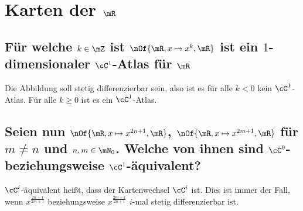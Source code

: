 \section{Karten der $\mR$}
\subsection{Für welche $k\in\mZ$ ist $\nOf{\mR,x\mapsto x^k,\mR}$ ist ein $1$-dimensionaler $\cC^1$-Atlas für $\mR$}
Die Abbildung soll stetig differenzierbar sein, also ist es für alle $k < 0$  kein $\cC^1$-Atlas. Für alle $k\geq 0$ ist es ein $\cC^1$-Atlas.

\subsection{Seien nun $\nOf{\mR,x\mapsto x^{2n+1},\mR}$, $\nOf{\mR,x\mapsto x^{2m+1},\mR}$ für $m\neq n$ und $n,m\in \mN_0$. Welche von ihnen sind $\cC^0$- beziehungsweise $\cC^1$-äquivalent?}
$\cC^i$-äquivalent heißt, dass der Kartenwechsel $\cC^i$ ist. Dies ist immer der Fall, wenn $x^{\frac{2n+1}{2m+1}}$ beziehungsweise $x^{\frac{2m+1}{2n+1}}$ $i$-mal stetig differenzierbar ist. 